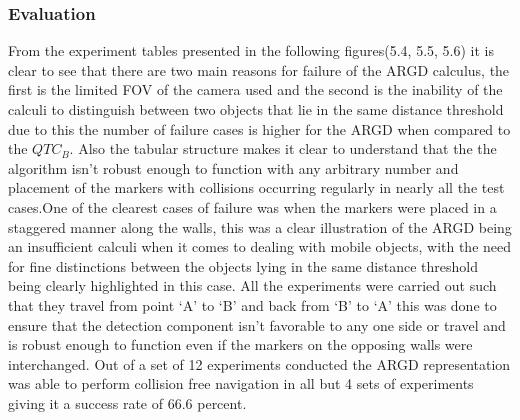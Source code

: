 \subsubsection*{Evaluation} From the experiment tables presented in the following figures(5.4, 5.5, 5.6) it is clear to see that there are two main reasons for failure of the ARGD calculus, the first is the limited FOV of the camera used and the second is the inability of the calculi to distinguish between two objects that lie in the same distance threshold due to this the number of failure cases is higher for the ARGD when compared to the $QTC_B$. Also the tabular structure makes it clear to understand that the the algorithm isn't robust enough to function with any arbitrary number and placement of the markers with collisions occurring regularly in nearly all the test cases.One of the clearest cases of failure was when the markers were placed in a staggered manner along the walls, this was a clear illustration of the ARGD being an insufficient calculi when it comes to dealing with mobile objects, with the need for fine distinctions between the objects lying in the same distance threshold being clearly highlighted in this case. All the experiments were carried out such that they travel from point `A' to `B' and back from `B' to `A' this was done to ensure that the detection component isn't favorable to any one side or travel and is robust enough to function even if the markers on the opposing walls were interchanged. Out of a set of 12 experiments conducted the ARGD representation was able to perform collision free navigation in all but 4 sets of experiments giving it a success rate of 66.6 percent.

